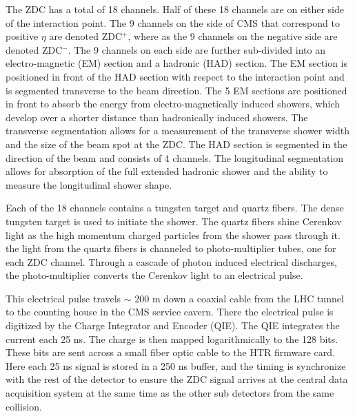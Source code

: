     The ZDC has a total of 18 channels.
        Half of these 18 channels are on either side of the interaction point.
    The 9 channels on the side of CMS that correspond to positive $\eta$
      are denoted ZDC$^{+}$, where as the 9 channels on the negative side are
      denoted ZDC$^{-}$.
    The 9 channels on each side are further sub-divided into an electro-magnetic  
      (EM) section and a hadronic (HAD) section.
    The EM section is positioned in front of the HAD section with respect to the 
      interaction point and is segmented transverse to the beam direction.
    The 5 EM sections are positioned in front to absorb the energy from 
      electro-magnetically induced showers, which develop over a shorter distance 
      than hadronically induced showers.
    The transverse segmentation allows for a measurement of the transverse shower
      width and the size of the beam spot at the ZDC.
    The HAD section is segmented in the direction of the beam and consists of 4
      channels.
    The longitudinal segmentation allows for absorption of the full extended 
      hadronic shower and the ability to measure the longitudinal shower shape.
    
    Each of the 18 channels contains a tungsten target and quartz fibers.
    The dense tungsten target is used to initiate the shower.
    The quartz fibers shine Cerenkov light as the high momentum charged particles
      from the shower pass through it. 
    the light from the quartz fibers is channeled to photo-multiplier tubes, one 
      for each ZDC channel. 
    Through a cascade of photon induced electrical discharges, the photo-multiplier
      converts the Cerenkov light to an electrical pulse. 
    
    This electrical pulse travels $\sim$ 200 m down a coaxial cable from the LHC
      tunnel to the counting house in the CMS service cavern. 
    There the electrical pulse is digitized by the Charge Integrator and Encoder 
      (QIE).
    The QIE integrates the current each 25 ns.
    The charge is then mapped logarithmically to the 128 bits. 
    These bits are sent across a small fiber optic cable to the HTR firmware card.
    Here each 25 ns signal is stored in a 250 ns buffer, and the timing is synchronize
      with the rest of the detector to ensure the ZDC signal arrives at the central
      data acquisition system at the same time as the other sub detectors from the 
      same collision. 
    
